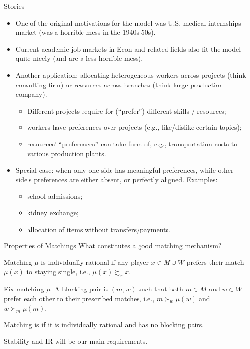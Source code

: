 \documentclass[english,10pt
,aspectratio=169
]{beamer}
\begin{document}
\begin{frame}{Stories}
\begin{itemize}
	\item One of the original motivations for the model was U.S. medical internships market (was a horrible mess in the 1940s-50s). 
	\item Current academic job markets in Econ and related fields also fit the model quite nicely (and are a less horrible mess).
	\item Another application: allocating heterogeneous workers across projects (think consulting firm) or resources across branches (think large production company).
	\begin{itemize}
		\item Different projects require for (``prefer'') different skills / resources;
		\item workers have preferences over projects (e.g., like/dislike certain topics);
		\item resources' ``preferences'' can take form of, e.g., transportation costs to various production plants.
	\end{itemize}
	\item Special case: when only one side has meaningful preferences, while other side's preferences are either absent, or perfectly aligned. Examples:
	\begin{itemize}
		\item school admissions;
		\item kidney exchange;
		\item allocation of items without transfers/payments.
	\end{itemize}
\end{itemize}
\end{frame}


\begin{frame}{Properties of Matchings}
What constitutes a good matching mechanism?
\begin{definition}
	Matching \alert{$\mu$} is \alert{individually rational} if any player $x \in M \cup W$ prefers their match $\mu(x)$ to staying single, i.e., $\mu(x) \succsim_x x$.
\end{definition}
\begin{definition}
	Fix matching $\mu$. A \alert{blocking pair} is \alert{$(m,w)$} such that both $m \in M$ and $w \in W$ prefer each other to their prescribed matches, i.e., $m \succ_w \mu(w)$ and $w \succ_m \mu(m)$.
\end{definition}
\begin{definition}
	Matching \structure{$\mu$} is  if it is individually rational and has no blocking pairs.
\end{definition}
Stability and IR will be our main requirements.
\end{frame}
\end{document}
